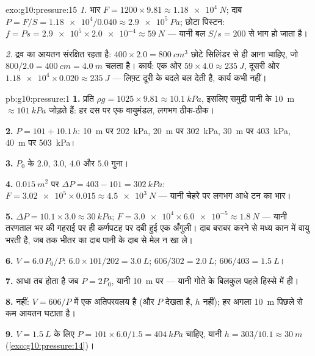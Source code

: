 \begin{solution}{exo:g10:pressure:15}
\emph{1.} भार $F = 1200 \times 9.81 \approx \qty{1.18e4}{N}$; दाब $P = F/S = \num{1.18e4}/0.040 \approx \qty{2.9e5}{Pa}$; छोटा पिस्टन: $f = P s = \num{2.9e5} \times \num{2.0e-4} \approx \qty{59}{N}$
--- यानी बल $S/s = 200$ से भाग हो जाता है।

\emph{2.} द्रव का आयतन संरक्षित रहता है: $400 \times 2.0 = \qty{800}{cm^3}$ छोटे सिलिंडर से ही आना
चाहिए, जो $800/2.0 = \qty{400}{cm} = \qty{4.0}{m}$ चलता है। कार्य: एक ओर $59 \times 4.0 \approx \qty{235}{J}$, दूसरी ओर $\num{1.18e4} \times 0.020 \approx \qty{235}{J}$ --- लिफ़्ट
दूरी के बदले बल देती है, कार्य कभी नहीं।
\end{solution}

\begin{solution}{pb:g10:pressure:1}
\textbf{1.} प्रति  $\rho g = 1025 \times 9.81 \approx \qty{10.1}{kPa}$, इसलिए समुद्री पानी के \qty{10}{m}
$\approx \qty{101}{kPa}$ जोड़ते हैं: हर दस  पर एक वायुमंडल, लगभग ठीक-ठीक।

\textbf{2.} $P = 101 + 10.1\,h$: \qty{10}{m} पर \qty{202}{kPa}, \qty{20}{m} पर \qty{302}{kPa}, \qty{30}{m} पर
\qty{403}{kPa}, \qty{40}{m} पर \qty{503}{kPa}।

\textbf{3.} $P_0$ के $2.0$, $3.0$, $4.0$ और $5.0$ गुना।

\textbf{4.} $\qty{0.015}{m^2}$ पर $\Delta P = 403 - 101 = \qty{302}{kPa}$: $F = \num{3.02e5} \times 0.015 \approx
\qty{4.5e3}{N}$ --- यानी चेहरे पर लगभग आधे टन
का भार।

\textbf{5.} $\Delta P = 10.1 \times 3.0 \approx \qty{30}{kPa}$; $F = \num{3.0e4} \times \num{6.0e-5} \approx \qty{1.8}{N}$ --- यानी तरणताल भर की गहराई पर ही कर्णपटह
पर दबी हुई एक अँगुली। दाब बराबर करने से मध्य कान में वायु भरती है, जब
तक भीतर का दाब पानी के दाब से मेल न खा ले।

\textbf{6.} $V = 6.0 \, P_0/P$: $6.0 \times 101/202 = \qty{3.0}{L}$; $606/302 = \qty{2.0}{L}$; $606/403 = \qty{1.5}{L}$।

\textbf{7.} आधा तब होता है जब $P = 2P_0$, यानी \qty{10}{m} पर --- यानी गोते के
बिलकुल पहले हिस्से में ही।

\textbf{8.} नहीं: $V = 606/P$  में एक अतिपरवलय है (और
 $P$ देखता है, $h$ नहीं); हर अगला \qty{10}{m}
पिछले से कम आयतन घटाता है।

\textbf{9.} $V = \qty{1.5}{L}$ के लिए $P = 101 \times 6.0/1.5 = \qty{404}{kPa}$ चाहिए, यानी $h = 303/10.1 \approx \qty{30}{m}$ (\cref{exo:g10:pressure:14})।


\end{solution}
